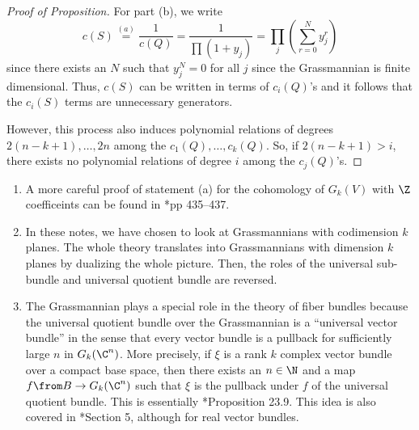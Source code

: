 \documentclass[11pt,leqno,oneside]{amsbook}
\numberwithin{thm}{section}
\begin{document}
\begin{proof}[Proof of Proposition]
  For part (b), we write \[
    c(S) \overset{(a)}{=} \frac{1}{c(Q)} = \frac{1}{\prod (1+y_j)} =
    \prod_j \left( \sum_{r=0}^N y_j^r \right)
  \]
  since there exists an \(N\) such that \(y_j^N = 0\) for all
  \(j\) since the Grassmannian is finite dimensional. Thus, \(c(S)\)
  can be written in terms of 
  \(c_i(Q)\)'s and it follows that the \(c_i(S)\) terms are
  unnecessary generators.

  However, this process also induces polynomial relations of degrees
  \(2(n-k+1), \ldots, 2n\) among the \(c_1(Q), \ldots, c_k(Q)\). So,
  if \(2(n-k+1) > i\), there exists no polynomial relations of degree
  \(i\) among the \(c_j(Q)\)'s. 
\end{proof}
\begin{rmk}
  \begin{enumerate}
  \item A more careful proof of statement (a) for the cohomology of
    \(G_k(V)\) with \(\Z\) coefficeints can be found in
    \cite{hatcher}*{pp 435--437}.
  \item In these notes, we have chosen to look at Grassmannians with
    codimension \(k\) planes. The whole theory translates into
    Grassmannians with dimension \(k\) planes by dualizing the whole
    picture. Then, the roles of the universal sub-bundle and universal
    quotient bundle are reversed. 
  \item The Grassmannian plays a special role in the theory of fiber
    bundles because the universal quotient bundle over the Grassmannian
    is a ``universal vector bundle'' in the sense that every vector
    bundle is a pullback for sufficiently large \(n\) in
    \(G_k(\C^n)\). More precisely, if \(\xi\) is a rank \(k\) complex
    vector bundle over a compact base space, then there exists an
    \(n \in \N\) and a map \(f \from B \to G_k(\C^n)\) such that
    \(\xi\) is the pullback under \(f\) of the universal quotient
    bundle. This is essentially \cite{bott-tu}*{Proposition
      23.9}. This idea is also covered in
    \cite{milnor-stasheff}*{Section 5}, although for real vector
    bundles. 
  \end{enumerate}
\end{rmk}
\end{document}
